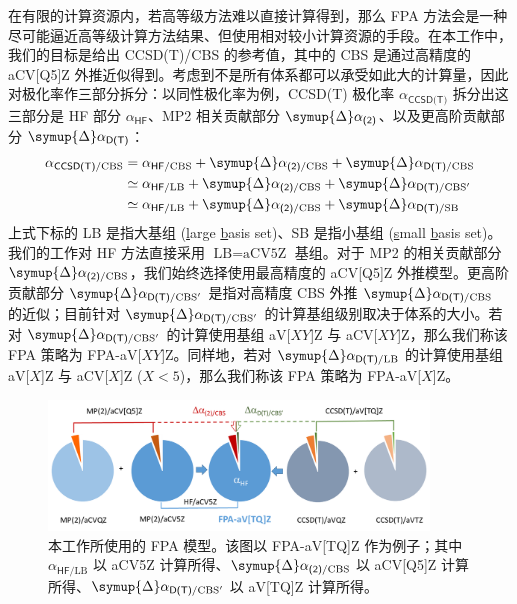 在有限的计算资源内，若高等级方法难以直接计算得到，那么 FPA 方法会是一种尽可能逼近高等级计算方法结果、但使用相对较小计算资源的手段。在本工作中，我们的目标是给出 CCSD(T)/CBS 的参考值，其中的 CBS 是通过高精度的 aCV[Q5]Z 外推近似得到。考虑到不是所有体系都可以承受如此大的计算量，因此对极化率作三部分拆分：以同性极化率为例，CCSD(T) 极化率 $\alpha_\textsf{CCSD(T)}$ 拆分出这三部分是 HF 部分 $\alpha_\textsf{HF}$、MP2 相关贡献部分 $\symup{\Delta} \alpha_\textsf{(2)}$、以及更高阶贡献部分 $\symup{\Delta} \alpha_\textsf{D(T)}$：
\begin{align}
    \alpha_{\textsf{CCSD(T)}/\text{CBS}} &= \alpha_{\textsf{HF}/\text{CBS}} + \symup{\Delta} \alpha_{\textsf{(2)}/\text{CBS}} + \symup{\Delta} \alpha_{\textsf{D(T)}/\text{CBS}} \notag\\
    &\simeq \alpha_{\textsf{HF}/\text{LB}} + \symup{\Delta} \alpha_{\textsf{(2)}/\text{CBS}} + \symup{\Delta} \alpha_{\textsf{D(T)}/\text{CBS}'} \notag\\
    &\simeq \alpha_{\textsf{HF}/\text{LB}} + \symup{\Delta} \alpha_{\textsf{(2)}/\text{CBS}} + \symup{\Delta} \alpha_{\textsf{D(T)}/\text{SB}}
\end{align}
上式下标的 LB 是指大基组 (\underline{l}arge \underline{b}asis set)、SB 是指小基组 (\underline{s}mall \underline{b}asis set)。我们的工作对 HF 方法直接采用 $\text{LB} = \text{aCV5Z}$ 基组。对于 MP2 的相关贡献部分 $\symup{\Delta} \alpha_{\textsf{(2)}/\text{CBS}}$，我们始终选择使用最高精度的 aCV[Q5]Z 外推模型。更高阶贡献部分 $\symup{\Delta} \alpha_{\textsf{D(T)}/\text{CBS}'}$ 是指对高精度 CBS 外推 $\symup{\Delta} \alpha_{\textsf{D(T)}/\text{CBS}}$ 的近似；目前针对 $\symup{\Delta} \alpha_{\textsf{D(T)}/\text{CBS}'}$ 的计算基组级别取决于体系的大小。若对 $\symup{\Delta} \alpha_{\textsf{D(T)}/\text{CBS}'}$ 的计算使用基组 aV[$XY$]Z 与 aCV[$XY$]Z，那么我们称该 FPA 策略为 FPA-aV[$XY$]Z。同样地，若对 $\symup{\Delta} \alpha_{\textsf{D(T)}/\text{LB}}$ 的计算使用基组 aV[$X$]Z 与 aCV[$X$]Z ($X < 5$)，那么我们称该 FPA 策略为 FPA-aV[$X$]Z。

\begin{figure}[ht]
    \centering
    \caption{本工作所使用的 FPA 模型。该图以 FPA-aV[TQ]Z 作为例子；其中 $\alpha_{\textsf{HF}/\text{LB}}$ 以 aCV5Z 计算所得、$\symup{\Delta} \alpha_{\textsf{(2)}/\text{CBS}}$ 以 aCV[Q5]Z 计算所得、$\symup{\Delta} \alpha_{\textsf{D(T)}/\text{CBS}'}$ 以 aV[TQ]Z 计算所得。}
    \label{fig.fig-1}
    \includegraphics[width=0.9\textwidth]{assets/fig-1.png}
\end{figure}

